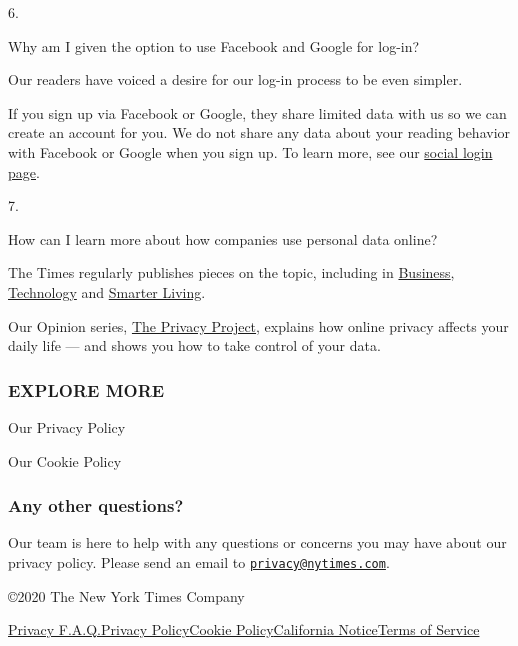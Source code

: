 6.

Why am I given the option to use Facebook and Google for log-in?

Our readers have voiced a desire for our log-in process to be even
simpler.

If you sign up via Facebook or Google, they share limited data with us
so we can create an account for you. We do not share any data about your
reading behavior with Facebook or Google when you sign up. To learn
more, see our
\href{https://help.nytimes.com/hc/en-us/articles/115014887628-Social-login}{social
login page}.

7.

How can I learn more about how companies use personal data online?

The Times regularly publishes pieces on the topic, including in
\href{https://www.nytimes.com/2019/11/04/business/secret-consumer-score-access.html}{Business},
\href{https://www.nytimes.com/2019/11/19/technology/artificial-intelligence-dawn-song.html}{Technology}
and
\href{https://www.nytimes.com/2019/11/24/smarter-living/privacy-online-how-to-stop-advertiser-tracking-opt-out.html}{Smarter
Living}.

Our Opinion series,
\href{https://www.nytimes.com/series/new-york-times-privacy-project}{The
Privacy Project}, explains how online privacy affects your daily life
--- and shows you how to take control of your data.

\hypertarget{explore-more}{%
\subsubsection{EXPLORE MORE}\label{explore-more}}

\href{/privacy/privacy-policy}{}

Our Privacy Policy

\href{/privacy/cookie-policy}{}

Our Cookie Policy

\hypertarget{any-other-questions}{%
\subsubsection{Any other questions?}\label{any-other-questions}}

Our team is here to help with any questions or concerns you may have
about our privacy policy. Please send an email to
\href{mailto:privacy@nytimes.com}{\nolinkurl{privacy@nytimes.com}}.

©2020 The New York Times Company

\href{/privacy}{Privacy F.A.Q.}\href{/privacy/privacy-policy}{Privacy
Policy}\href{/privacy/cookie-policy}{Cookie
Policy}\href{/privacy/california-notice}{California
Notice}\href{https://help.nytimes.com/hc/en-us/articles/115014893428-Terms-of-service}{Terms
of Service}
